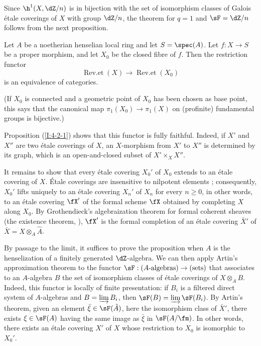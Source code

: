 Since $\h^1(X,\dZ/n)$ is in bijection with the set of isomorphism classes
of Galois étale coverings of $X$ with group $\dZ/n$, the theorem for
$q=1$ and $\sF=\dZ/n$ follows from the next proposition.

\begin{proposition}\label{I:4-2-2}
Let $A$ be a noetherian henselian local ring and let $S=\spec(A)$. Let
$f:X\to S$ be a proper morphism, and let $X_0$ be the closed fibre of $f$. Then
the restriction functor
\[
  \operatorname{Rev.et}(X) \to \operatorname{Rev.et}(X_0)
\]
is an equivalence of categories.
\end{proposition}

(If $X_0$ is connected and a geometric point of $X_0$ has been chosen
as base point, this says that the canonical map
$\pi_1(X_0)\to\pi_1(X)$ on (profinite) fundamental groups is bijective.)

Proposition (\ref{I:4-2-1}) shows that this functor is fully faithful.
Indeed, if $X'$ and $X''$ are two étale coverings of $X$, an
$X$-morphism from $X'$ to $X''$ is determined by its graph, which is an
open-and-closed subset of $X'\times_XX''$.

It remains to show that every étale covering $X_0'$ of $X_0$ extends to
an étale covering of $X$. Étale coverings are insensitive to nilpotent
elements \cite[ch.1]{sga1}; consequently, $X_0'$ lifts uniquely to an
étale covering $X_n'$ of $X_n$ for every $n\geqslant0$, in other words,
to an étale covering $\fX'$ of the formal scheme $\fX$ obtained by
completing $X$ along $X_0$. By Grothendieck's algebraization theorem for
formal coherent sheaves (the existence theorem, \cite[III.5]{ega}),
$\fX'$ is the formal completion of an étale covering $\bar X'$ of
$\bar X=X\otimes_A\hat A$.

By passage to the limit, it suffices to prove the proposition when $A$ is
the henselization of a finitely generated $\dZ$-algebra. We can then
apply Artin's approximation theorem to the functor
$\sF:(\textnormal{$A$-algebras})\to(\textnormal{sets})$ that associates
to an $A$-algebra $B$ the set of isomorphism classes of étale coverings
of $X\otimes_AB$. Indeed, this functor is locally of finite presentation:
if $B_i$ is a filtered direct system of $A$-algebras and
$B=\varinjlim B_i$, then $\sF(B)=\varinjlim\sF(B_i)$. By Artin's
theorem, given an element $\bar\xi\in\sF(\hat A)$, here the isomorphism class
of $\bar X'$, there exists $\xi\in\sF(A)$ having the same image as
$\bar\xi$ in $\sF(A/\fm)$. In other words, there exists an étale
covering $X'$ of $X$ whose restriction to $X_0$ is isomorphic to
$X_0'$.

